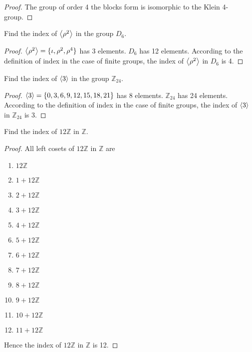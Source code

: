 \begin{proof}
    The group of order 4 the blocks form is isomorphic to the Klein 4-group.
\end{proof}

\newpage
\begin{exercise}
    Find the index of $\left\langle{\rho^{2}}\right\rangle$ in the group $D_{6}$.
\end{exercise}

\begin{proof}
    $\left\langle{\rho^{2}}\right\rangle = \{ \iota, \rho^{2}, \rho^{4} \}$ has 3 elements. $D_{6}$ has 12 elements. According to the definition of index in the case of finite groups, the index of $\left\langle{\rho^{2}}\right\rangle$ in $D_{6}$ is 4.
\end{proof}

\newpage
\begin{exercise}
    Find the index of $\left\langle{3}\right\rangle$ in the group $\mathbb{Z}_{24}$.
\end{exercise}

\begin{proof}
    $\left\langle{3}\right\rangle = \{ 0, 3, 6, 9, 12, 15, 18, 21 \}$ has 8 elements. $\mathbb{Z}_{24}$ has 24 elements. According to the definition of index in the case of finite groups, the index of $\left\langle{3}\right\rangle$ in $\mathbb{Z}_{24}$ is 3.
\end{proof}

\newpage
\begin{exercise}
    Find the index of $12\mathbb{Z}$ in $\mathbb{Z}$.
\end{exercise}

\begin{proof}
    All left cosets of $12\mathbb{Z}$ in $\mathbb{Z}$ are
    \begin{enumerate}[label={(\arabic*)}]
        \item $12\mathbb{Z}$
        \item $1 + 12\mathbb{Z}$
        \item $2 + 12\mathbb{Z}$
        \item $3 + 12\mathbb{Z}$
        \item $4 + 12\mathbb{Z}$
        \item $5 + 12\mathbb{Z}$
        \item $6 + 12\mathbb{Z}$
        \item $7 + 12\mathbb{Z}$
        \item $8 + 12\mathbb{Z}$
        \item $9 + 12\mathbb{Z}$
        \item $10 + 12\mathbb{Z}$
        \item $11 + 12\mathbb{Z}$
    \end{enumerate}

    Hence the index of $12\mathbb{Z}$ in $\mathbb{Z}$ is 12.
\end{proof}


